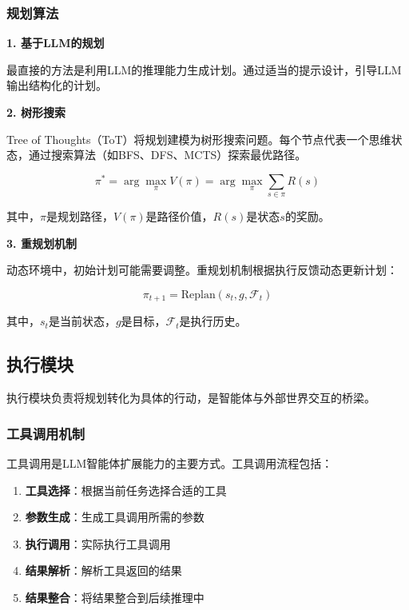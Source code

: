 \subsubsection{规划算法}

\textbf{1. 基于LLM的规划}

最直接的方法是利用LLM的推理能力生成计划。通过适当的提示设计，引导LLM输出结构化的计划。

\textbf{2. 树形搜索}

Tree of Thoughts（ToT）将规划建模为树形搜索问题。每个节点代表一个思维状态，通过搜索算法（如BFS、DFS、MCTS）探索最优路径。

\begin{equation}
    \pi^* = \arg\max_{\pi} V(\pi) = \arg\max_{\pi} \sum_{s \in \pi} R(s)
\end{equation}

其中，$\pi$是规划路径，$V(\pi)$是路径价值，$R(s)$是状态$s$的奖励。

\textbf{3. 重规划机制}

动态环境中，初始计划可能需要调整。重规划机制根据执行反馈动态更新计划：

\begin{equation}
    \pi_{t+1} = \text{Replan}(s_t, g, \mathcal{F}_t)
\end{equation}

其中，$s_t$是当前状态，$g$是目标，$\mathcal{F}_t$是执行历史。

\subsection{执行模块}

执行模块负责将规划转化为具体的行动，是智能体与外部世界交互的桥梁。

\subsubsection{工具调用机制}

工具调用是LLM智能体扩展能力的主要方式。工具调用流程包括：

\begin{enumerate}[leftmargin=2em]
    \item \textbf{工具选择}：根据当前任务选择合适的工具
    \item \textbf{参数生成}：生成工具调用所需的参数
    \item \textbf{执行调用}：实际执行工具调用
    \item \textbf{结果解析}：解析工具返回的结果
    \item \textbf{结果整合}：将结果整合到后续推理中
\end{enumerate}

